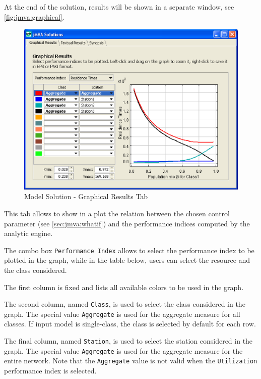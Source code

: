 At the end of the solution, results will be shown in a separate
window, see \autoref{fig:jmva:graphical}.
\begin{figure}[htbp]
    \begin{center}
        \includegraphics[scale=.5]{img/jmva/Graphical}
    \end{center}
    \caption{Model Solution - Graphical Results Tab}
    \label{fig:jmva:graphical}
\end{figure}
This tab allows to show in a plot the relation between the chosen
control parameter (see \autoref{sec:jmva:whatif}) and the
performance indices computed by the analytic engine.

The combo box \texttt{Performance Index} allows to select the
performance index to be plotted in the graph, while in the table
below, users can select the resource and the class considered.
\begin{itemize*}
\item The first column is fixed and lists all available colors to be
used in the graph.
\item The second column, named \texttt{Class}, is used to select the
class considered in the graph. The special value \texttt{Aggregate}
is used for the aggregate measure for all classes. If input model is
single-class, the class is selected by default for each row.
\item The final column, named \texttt{Station}, is used to select the
station considered in the graph. The special value
\texttt{Aggregate} is used for the aggregate measure for the entire
network. Note that the \texttt{Aggregate} value is not valid when
the \texttt{Utilization} performance index is selected.
\end{itemize*}


